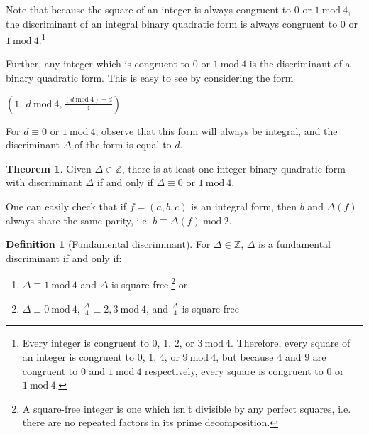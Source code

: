 \documentclass{article}
\theoremstyle{definition}
\newtheorem{definition}{Definition}[section]
\theoremstyle{theorem}
\newtheorem{theorem}{Theorem}[section]
\theoremstyle{example}
\theoremstyle{corollary}
\begin{document}
\bigskip

Note that because the square of an integer is always congruent to \(0\) or \(1 \ \textrm{mod} \ 4\), the discriminant of an integral binary quadratic form is always congruent to \(0\) or \(1 \ \textrm{mod} \ 4\).\footnote{Every integer is congruent to \(0\), \(1\), \(2\), or \(3 \ \textrm{mod} \ 4\). Therefore, every square of an integer is congruent to \(0\), \(1\), \(4\), or \(9 \ \textrm{mod} \ 4\), but because \(4\) and \(9\) are congruent to \(0\) and \(1 \ \textrm{mod} \ 4\) respectively, every square is congruent to \(0\) or \(1 \ \textrm{mod} \ 4\).}

\bigskip

Further, any integer which is congruent to \(0\) or \(1 \ \textrm{mod} \ 4\) is the discriminant of a binary quadratic form. This is easy to see by considering the form
\begin{center}
\(\left(1,\ d \ \textrm{mod} \ 4, \frac{(d \ \textrm{mod} \ 4) - d}{4}\right)\)
\end{center}
For \(d \equiv 0\) or \(1 \ \textrm{mod} \ 4\), observe that this form will always be integral, and the discriminant \(\Delta\) of the form is equal to \(d\).

\bigskip

\theoremstyle{theorem}
\begin{theorem}
Given \(\Delta \in \mathbb{Z}\), there is at least one integer binary quadratic form with discriminant \(\Delta\) if and only if \(\Delta \equiv 0\) or \(1 \ \textrm{mod} \ 4\).
\end{theorem}

\bigskip

One can easily check that if \(f = (a, b, c)\) is an integral form, then \(b\) and \(\Delta(f)\) always share the same parity, i.e. \(b \equiv \Delta(f) \ \textrm{mod} \ 2\).

\bigskip

\theoremstyle{definition}
\begin{definition}[Fundamental discriminant]
For \(\Delta \in \mathbb{Z}\), \(\Delta\) is a fundamental discriminant if and only if:
\begin{enumerate}
\item \(\Delta \equiv 1 \ \textrm{mod} \ 4\) and \(\Delta\) is square-free,\footnote{A square-free integer is one which isn't divisible by any perfect squares, i.e. there are no repeated factors in its prime decomposition.} or
\item \(\Delta \equiv 0 \ \textrm{mod} \ 4\), \(\frac{\Delta}{4} \equiv 2, 3 \ \textrm{mod} \ 4\), and \(\frac{\Delta}{4}\) is square-free
\end{enumerate}
\end{definition}
\end{document}
